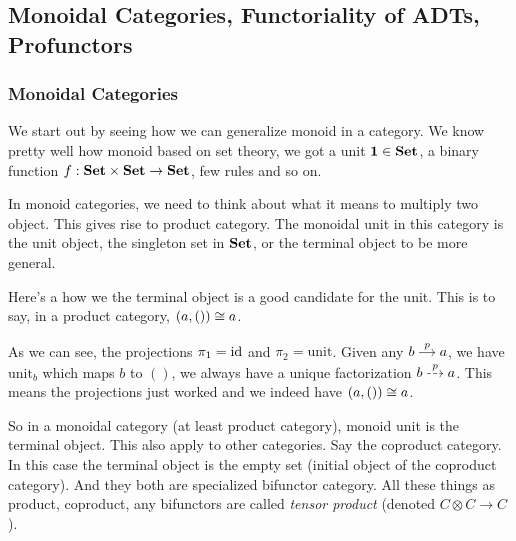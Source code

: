 
\setcounter{section}{7}
\setcounter{subsection}{1}
\subsection{Monoidal Categories, Functoriality of ADTs, Profunctors}

\subsubsection{Monoidal Categories}

We start out by seeing how we can generalize monoid in a category. We know
pretty well how monoid based on set theory, we got a unit $\mathbf{1} \in \mathbf{Set}$,
a binary function $f : \mathbf{Set} \times \mathbf{Set} \to \mathbf{Set}$, few rules and so on.

In monoid categories, we need to think about what it means to multiply two
object. This gives rise to product category. The monoidal unit in this category
is the unit object, the singleton set in $\mathbf{Set}$, or the terminal object to be
more general.

Here's a how we the terminal object is a good candidate for the unit. This is to
say, in a product category, $(a, ()) \iso a$.

\begin{center}
\end{center}

As we can see, the projections $\pi_1 = \mathrm{id}$ and $\pi_2 = \mathrm{unit}$. Given
any $\cd{b \rar{p} \& a}$, we have $\mathrm{unit}_b$ which maps $b$ to $()$, we
always have a unique factorization $\cd{b \ar[dashed]{r}{p} \& a}$. This means
the projections just worked and we indeed have $(a, ()) \iso a$.

So in a monoidal category (at least product category), monoid unit is the
terminal object. This also apply to other categories. Say the coproduct
category. In this case the terminal object is the empty set (initial object of
the coproduct category). And they both are specialized bifunctor category. All
these things as product, coproduct, any bifunctors are called \emph{tensor product}
(denoted $C \otimes C \to C$).

